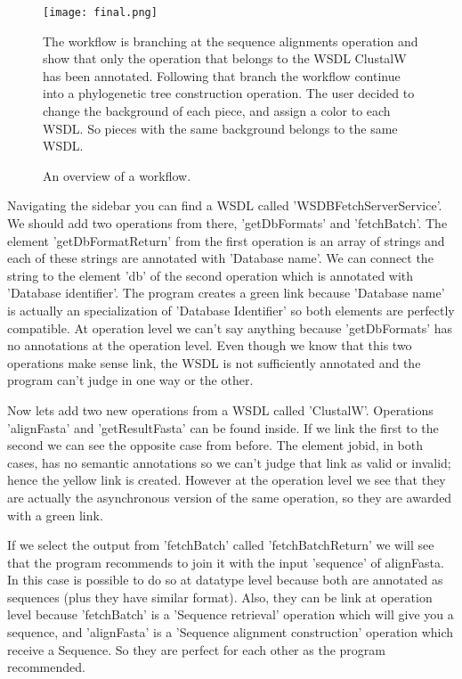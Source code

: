 \documentclass[a4paper,10pt]{article}
\begin{document}
  \begin{figure}[H]
  {\centering  
  \texttt{[image: final.png]}
  \caption{An overview of a workflow.}\label{fig:workflowOverview}}
  \medskip
  \small
  The workflow is branching at the sequence alignments operation and show that only the operation that belongs to the WSDL ClustalW has been annotated. Following that branch the workflow continue into a phylogenetic tree construction operation. The user decided to change the background of each piece, and assign a color to each WSDL. So pieces with the same background belongs to the same WSDL.
  \end{figure}

  Navigating the sidebar you can find a WSDL called 'WSDBFetchServerService'. We should add two operations from there, 'getDbFormats' and 'fetchBatch'. The element 'getDbFormatReturn' from the first operation is an array of strings and each of these strings are annotated with 'Database name'. We can connect the string to the element 'db' of the second operation which is annotated with 'Database identifier'. The program creates a green link because 'Database name' is actually an specialization of 'Database Identifier' so both elements are perfectly compatible. At operation level we can't say anything because 'getDbFormats' has no annotations at the operation level. Even though we know that this two operations make sense link, the WSDL is not sufficiently annotated and the program can't judge in one way or the other.\vspace{3 mm}

  Now lets add two new operations from a WSDL called 'ClustalW'. Operations 'alignFasta' and 'getResultFasta' can be found inside. If we link the first to the second we can see the opposite case from before. The element jobid, in both cases, has no semantic annotations so we can't judge that link as valid or invalid; hence the yellow link is created. However at the operation level we see that they are actually the asynchronous version of the same operation, so they are awarded with a green link.\vspace{3 mm}

  If we select the output from 'fetchBatch' called 'fetchBatchReturn' we will see that the program recommends to join it with the input 'sequence' of alignFasta. In this case is possible to do so at datatype level because both are annotated as sequences (plus they have similar format). Also, they can be link at operation level because 'fetchBatch' is a 'Sequence retrieval' operation which will give you a sequence, and 'alignFasta' is a 'Sequence alignment construction' operation which receive a Sequence. So they are perfect for each other as the program recommended.\vspace{3 mm}
\end{document}
